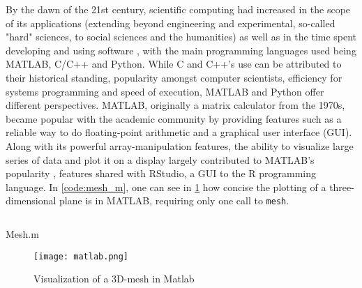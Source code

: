 By the dawn of the 21st century, scientific computing had increased in the scope of its applications (extending beyond engineering and experimental, so-called "hard" sciences, to social sciences and the humanities) as well as in the time spent developing and using software \citep{prabhu_survey_2011} \citep{hannay_how_2009}, with the main programming languages used being MATLAB, C/C++ and Python. While C and C++'s use can be attributed to their historical standing, popularity amongst computer scientists, efficiency for systems programming and speed of execution, MATLAB and Python offer different perspectives. MATLAB, originally a matrix calculator from the 1970s, became popular with the academic community by providing features such as a reliable way to do floating-point arithmetic and a graphical user interface (GUI). Along with its powerful array-manipulation features, the ability to visualize large series of data and plot it on a display largely contributed to MATLAB's popularity \citep{moler_history_2020}, features shared with RStudio, a GUI to the R programming language. In \ref{code:mesh_m}, one can see in \ref{graphic:mesh-visualization} how concise the plotting of a three-dimensional plane is in MATLAB, requiring only one call to \lstinline{mesh}.

\begin{listing}
  \inputminted{matlab}{./corpus/mesh.matlab}
  \caption{Mesh.m}
  \label{code:mesh_m}
\end{listing}

\begin{figure}
  \texttt{[image: matlab.png]}
  \caption{Visualization of a 3D-mesh in Matlab}
  \label{graphic:mesh-visualization}
\end{figure}

